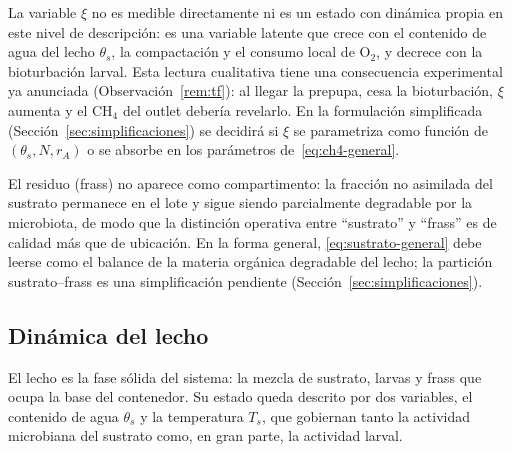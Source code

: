 \begin{remark}
\label{rem:xi}
La variable $\xi$ no es medible directamente ni es un estado con din\'amica propia en este nivel de descripci\'on: es una variable latente que crece con el contenido de agua del lecho $\theta_s$, la compactaci\'on y el consumo local de O$_2$, y decrece con la bioturbaci\'on larval. Esta lectura cualitativa tiene una consecuencia experimental ya anunciada (Observaci\'on~\ref{rem:tf}): al llegar la prepupa, cesa la bioturbaci\'on, $\xi$ aumenta y el CH$_4$ del outlet deber\'ia revelarlo. En la formulaci\'on simplificada (Secci\'on~\ref{sec:simplificaciones}) se decidir\'a si $\xi$ se parametriza como funci\'on de $(\theta_s, N, r_A)$ o se absorbe en los par\'ametros de~\eqref{eq:ch4-general}.
\end{remark}

\begin{remark}
\label{rem:frass}
El residuo (frass) no aparece como compartimento: la fracci\'on no asimilada del sustrato permanece en el lote y sigue siendo parcialmente degradable por la microbiota, de modo que la distinci\'on operativa entre ``sustrato'' y ``frass'' es de calidad m\'as que de ubicaci\'on. En la forma general, \eqref{eq:sustrato-general} debe leerse como el balance de la materia org\'anica degradable del lecho; la partici\'on sustrato--frass es una simplificaci\'on pendiente (Secci\'on~\ref{sec:simplificaciones}).
\end{remark}

\subsection{Din\'amica del lecho}
\label{sec:lecho}

El lecho es la fase s\'olida del sistema: la mezcla de sustrato, larvas y frass que ocupa la base del contenedor. Su estado queda descrito por dos variables, el contenido de agua $\theta_s$ y la temperatura $T_s$, que gobiernan tanto la actividad microbiana del sustrato como, en gran parte, la actividad larval.

